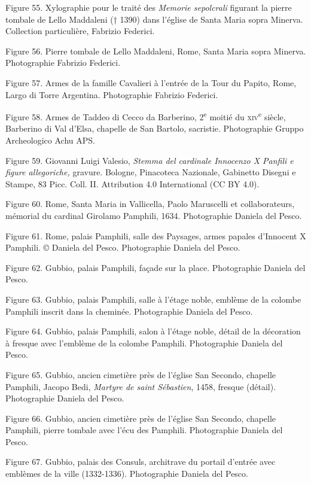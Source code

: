 \documentclass[12pt,twoside,openany]{book}
\begin{document}
Figure 55. Xylographie pour le traité des \textit{Memorie sepolcrali} figurant la pierre tombale de Lello Maddaleni († 1390) dans l’église de Santa Maria sopra Minerva. Collection particulière, Fabrizio Federici.

Figure 56. Pierre tombale de Lello Maddaleni, Rome, Santa Maria sopra Minerva. Photographie Fabrizio Federici.

Figure 57. Armes de la famille Cavalieri à l’entrée de la Tour du Papito, Rome, Largo di Torre Argentina. Photographie Fabrizio Federici.

Figure 58. Armes de Taddeo di Cecco da Barberino, 2\textsuperscript{e} moitié du \textsc{xiv}\textsuperscript{e} siècle, Barberino di Val d’Elsa, chapelle de San Bartolo, sacristie. Photographie Gruppo Archeologico Achu APS.

Figure 59. Giovanni Luigi Valesio, \textit{Stemma del cardinale Innocenzo X Panfili e figure allegoriche, }gravure. Bologne, Pinacoteca Nazionale, Gabinetto Disegni e Stampe, 83 Picc. Coll. II. Attribution 4.0 International (CC BY 4.0).

Figure 60. Rome, Santa Maria in Vallicella, Paolo Maruscelli et collaborateurs, mémorial du cardinal Girolamo Pamphili, 1634. Photographie Daniela del Pesco.

Figure 61. Rome, palais Pamphili, salle des Paysages, armes papales d’Innocent X Pamphili. © Daniela del Pesco. Photographie Daniela del Pesco.

Figure 62. Gubbio, palais Pamphili, façade sur la place. Photographie Daniela del Pesco.

Figure 63. Gubbio, palais Pamphili, salle à l’étage noble, emblème de la colombe Pamphili inscrit dans la cheminée. Photographie Daniela del Pesco.

Figure 64. Gubbio, palais Pamphili, salon à l’étage noble, détail de la décoration à fresque avec l’emblème de la colombe Pamphili. Photographie Daniela del Pesco.

Figure 65. Gubbio, ancien cimetière près de l’église San Secondo, chapelle Pamphili, Jacopo Bedi, \textit{Martyre de saint Sébastien}, 1458, fresque (détail). Photographie Daniela del Pesco.

Figure 66. Gubbio, ancien cimetière près de l’église San Secondo, chapelle Pamphili, pierre tombale avec l’écu des Pamphili. Photographie Daniela del Pesco.

Figure 67. Gubbio, palais des Consuls, architrave du portail d’entrée avec emblèmes de la ville (1332-1336). Photographie Daniela del Pesco.
\end{document}
